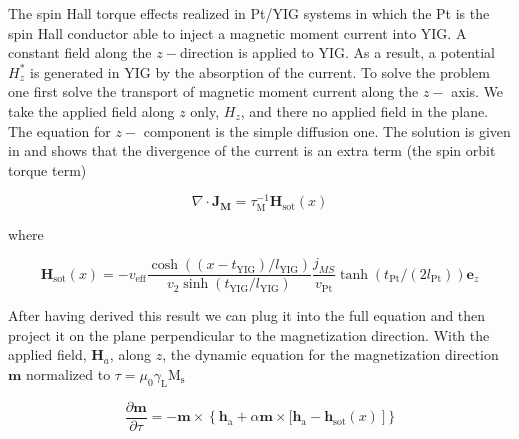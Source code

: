 \documentclass[twocolumn, final]{elsarticle}
\begin{document}
The spin Hall torque effects  realized in Pt/YIG systems in which the Pt is the spin Hall conductor able to inject a magnetic moment current into YIG. A constant field along the $z-$direction is applied to YIG. As a result, a potential 
$H^*_z$ is generated in YIG by the absorption of the current. To solve the problem one first solve the transport of magnetic moment current along the $z-$ axis. We take the applied field along $z$ only, $H_z$, and there no applied field 
in the plane. The equation for $z-$ component is the simple diffusion one. The solution is given in \cite{basso2016thermodynamic} and shows that the divergence of the current is an extra term (the spin orbit torque term)

\begin{equation}
\nabla \cdot \mathbf{J}_{\mathbf{M}} = \tau^{-1}_{{\mathrm{\scriptstyle{M}}}}\mathbf{H}_{\mathrm{\scriptstyle{sot}}}(x)
\end{equation}

where 


\begin{equation}
\mathbf{H}_{\mathrm{\scriptstyle{sot}}}(x) = - v_{\mathrm{\scriptstyle{eff}}} \frac{\cosh((x-t_{\mathrm{\scriptstyle{YIG}}})/l_{\mathrm{\scriptstyle{YIG}}})}{v_2 
\sinh(t_{\mathrm{\scriptstyle{YIG}}}/l_{\mathrm{\scriptstyle{YIG}}})} \frac{j_{MS}}{v_{\mathrm{\scriptstyle{Pt}}}} \tanh(t_{\mathrm{\scriptstyle{Pt}}}/(2 l_{\mathrm{\scriptstyle{Pt}}}))
\mathbf{e}_z
\end{equation}

After having derived this result we can plug it into the full equation and then project it on the plane perpendicular to the magnetization direction. With the applied field, $\mathbf{H}_{a}$, along $z$, the 
dynamic equation for the magnetization direction $\mathbf{m} $  normalized to $\tau=\mu_0\gamma_{\mathrm{\scriptstyle{L}}}\mathrm{M}_{\mathrm{\scriptstyle{s}}}$



\begin{equation}
\label{equation:dimensionless_lle}
\frac{\partial \mathbf{m}}{\partial  \tau}=-\mathbf{m} \times \left\{ \mathbf{h}_{\mathrm{\scriptstyle{a}}}+\alpha \mathbf{m} \times[ \mathbf{h}_{\mathrm{\scriptstyle{a}}}-\mathbf{h}
_{\mathrm{\scriptstyle{sot}}}(x)\right]\}
\end{equation}
\end{document}
